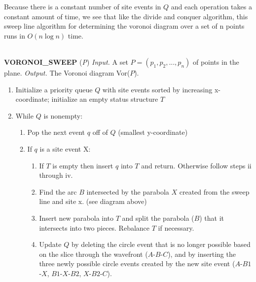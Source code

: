 \documentclass[10pt]{article}
\begin{document}
Because there is a constant number of site events in $Q$ and each operation
takes a constant amount of time, we see that like the divide and conquer 
algorithm, this sweep line algorithm for determining the voronoi diagram 
over a set of n points runs in $O(n \log n)$ time.

\begin{center}
\end{center}

\parbox{4.5in}{
\hrulefill \\
{\bf VORONOI\_SWEEP} ({\sl P})\newline
{\sl Input.} A set $P=(p_1,p_2,...,p_n)$ of points in the plane.\newline
{\sl Output.} The Voronoi diagram Vor($P$).
\begin{enumerate}

\item Initialize a priority queue $Q$ with site events sorted by increasing
x-coordinate; initialize an empty status structure $T$

\item While $Q$ is nonempty:

\begin{enumerate}

\item Pop the next event $q$ off of $Q$ (smallest y-coordinate)

\item If $q$ is a site event X:

\begin{enumerate}

\item If $T$ is empty then insert $q$ into $T$ and return.  Otherwise
follow steps ii through iv.

\item Find the arc $B$ intersected by the parabola $X$ created from the 
sweep line and site x. (see diagram above)

\item Insert new parabola into $T$ and split the parabola ($B$) that it 
intersects into two pieces.  Rebalance $T$ if necessary.

\item Update $Q$ by deleting the circle event that is no longer possible based
on the slice through the wavefront ($A$-$B$-$C$), and by inserting the three 
newly possible circle events created by the new site event ($A$-$B1$-$X$, 
$B1$-$X$-$B2$, $X$-$B2$-$C$).


\end{enumerate}
\end{enumerate}
\end{enumerate}}
\end{document}
